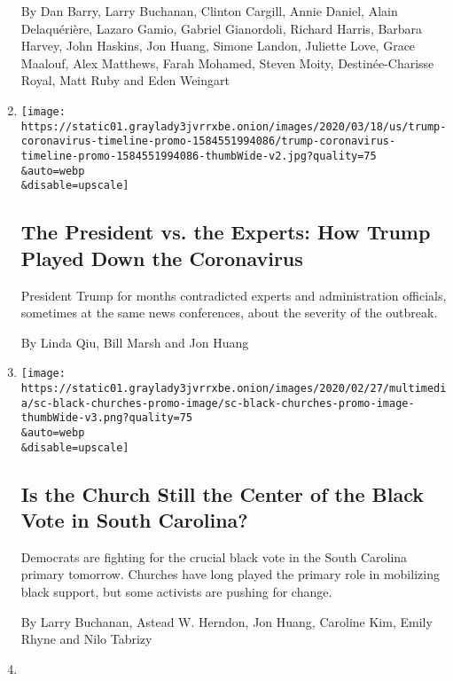 \begin{enumerate}
  By Dan Barry, Larry Buchanan, Clinton Cargill, Annie Daniel, Alain
  Delaquérière, Lazaro Gamio, Gabriel Gianordoli, Richard Harris,
  Barbara Harvey, John Haskins, Jon Huang, Simone Landon, Juliette Love,
  Grace Maalouf, Alex Matthews, Farah Mohamed, Steven Moity,
  Destinée-Charisse Royal, Matt Ruby and Eden Weingart
\item
  \href{/interactive/2020/03/18/us/trump-coronavirus-statements-timeline.html}{}

  \texttt{[image: https://static01.graylady3jvrrxbe.onion/images/2020/03/18/us/trump-coronavirus-timeline-promo-1584551994086/trump-coronavirus-timeline-promo-1584551994086-thumbWide-v2.jpg?quality=75\\\&auto=webp\\\&disable=upscale]}

  \hypertarget{the-president-vs-the-experts-how-trump-played-down-the-coronavirus}{%
  \subsection{The President vs. the Experts: How Trump Played Down the
  Coronavirus}\label{the-president-vs-the-experts-how-trump-played-down-the-coronavirus}}

  President Trump for months contradicted experts and administration
  officials, sometimes at the same news conferences, about the severity
  of the outbreak.

  By Linda Qiu, Bill Marsh and Jon Huang
\item
  \href{/interactive/2020/02/27/us/politics/black-church-elections.html}{}

  \texttt{[image: https://static01.graylady3jvrrxbe.onion/images/2020/02/27/multimedia/sc-black-churches-promo-image/sc-black-churches-promo-image-thumbWide-v3.png?quality=75\\\&auto=webp\\\&disable=upscale]}

  \hypertarget{is-the-church-still-the-center-of-the-black-vote-in-south-carolina}{%
  \subsection{Is the Church Still the Center of the Black Vote in South
  Carolina?}\label{is-the-church-still-the-center-of-the-black-vote-in-south-carolina}}

  Democrats are fighting for the crucial black vote in the South
  Carolina primary tomorrow. Churches have long played the primary role
  in mobilizing black support, but some activists are pushing for
  change.

  By Larry Buchanan, Astead W. Herndon, Jon Huang, Caroline Kim, Emily
  Rhyne and Nilo Tabrizy
\item
  \href{/interactive/2020/01/23/us/politics/impeachment-senate-chamber-diagram.html}{}


\end{enumerate}

